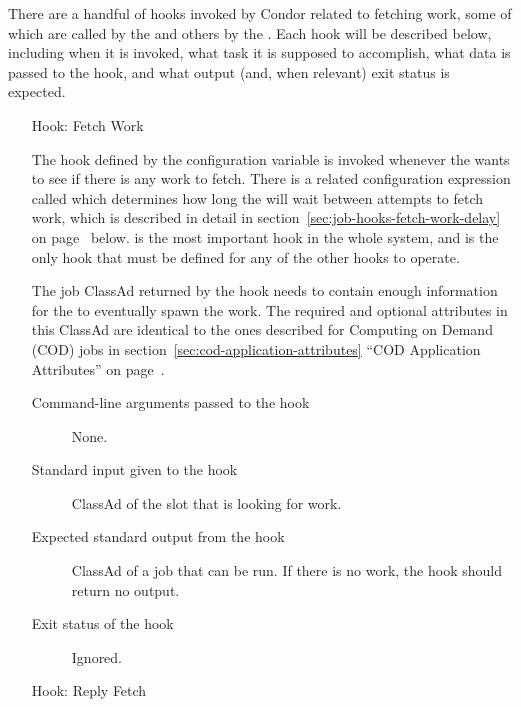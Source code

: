 There are a handful of hooks invoked by Condor related to fetching
work, some of which are called by the  and others by
the .
Each hook will be described below, including when it is invoked, what
task it is supposed to accomplish, what data is passed to the hook,
and what output (and, when relevant) exit status is expected.


\begin{itemize}
\item[Hook: Fetch Work]

The hook defined by the configuration variable
 is invoked whenever the 
wants to see if there is any work to fetch.
There is a related configuration expression called
 which determines how long the 
will wait between attempts to fetch work, which is described in detail
in section~\ref{sec:job-hooks-fetch-work-delay} on
page~\pageref{sec:job-hooks-fetch-work-delay} below.
 is the most important hook in the whole
system, and is the only hook that must be defined for any of the other
 hooks to operate.

The job ClassAd returned by the hook needs to contain enough
information for the  to eventually spawn the work.
The required and optional attributes in this ClassAd are identical to
the ones described for Computing on Demand (COD) jobs in
section~\ref{sec:cod-application-attributes} 
``COD Application Attributes'' on
page~\pageref{sec:cod-application-attributes}.

\begin{description}
\item[Command-line arguments passed to the hook]
  None.

\item[Standard input given to the hook]
  ClassAd of the slot that is looking for work.

\item[Expected standard output from the hook]
  ClassAd of a job that can be run.
  If there is no work, the hook should return no output.

\item[Exit status of the hook]
  Ignored.
\end{description}


\item[Hook: Reply Fetch]


\end{itemize}
